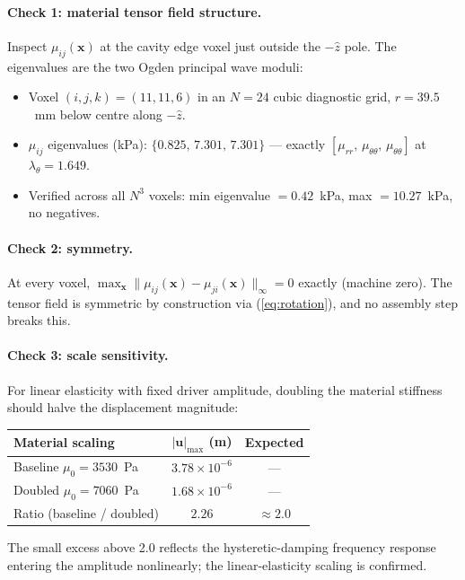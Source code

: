 \documentclass[11pt,letterpaper]{article}
\newcommand{\vect}[1]{\boldsymbol{#1}}
\begin{document}
\paragraph{Check 1: material tensor field structure.}
Inspect $\mu_{ij}(\vect x)$ at the cavity edge voxel just outside
the $-\hat z$ pole. The eigenvalues are the two Ogden principal wave
moduli:
\begin{itemize}
\item Voxel $(i,j,k) = (11, 11, 6)$ in an $N = 24$ cubic diagnostic grid, $r = 39.5$~mm below centre along $-\hat z$.
\item $\mu_{ij}$ eigenvalues (kPa): $\{0.825,\, 7.301,\, 7.301\}$ — exactly
      $[\mu_{rr},\, \mu_{\theta\theta},\, \mu_{\theta\theta}]$ at
      $\lambda_\theta = 1.649$.
\item Verified across all $N^3$ voxels: min eigenvalue $= 0.42$~kPa,
      max $= 10.27$~kPa, no negatives.
\end{itemize}

\paragraph{Check 2: symmetry.} At every voxel,
$\max_{\vect x}\|\mu_{ij}(\vect x) - \mu_{ji}(\vect x)\|_\infty = 0$
exactly (machine zero). The tensor field is symmetric by construction
via (\ref{eq:rotation}), and no assembly step breaks this.

\paragraph{Check 3: scale sensitivity.} For linear elasticity with
fixed driver amplitude, doubling the material stiffness should halve
the displacement magnitude:
\begin{center}
\begin{tabular}{lcc}
\toprule
Material scaling & $|\vect u|_{\max}$ (m) & Expected \\
\midrule
Baseline $\mu_0 = 3530$~Pa            & $3.78 \times 10^{-6}$ & — \\
Doubled $\mu_0 = 7060$~Pa             & $1.68 \times 10^{-6}$ & — \\
Ratio (baseline / doubled)            & $2.26$                & $\approx 2.0$ \\
\bottomrule
\end{tabular}
\end{center}
The small excess above 2.0 reflects the hysteretic-damping frequency
response entering the amplitude nonlinearly; the linear-elasticity
scaling is confirmed.
\end{document}

